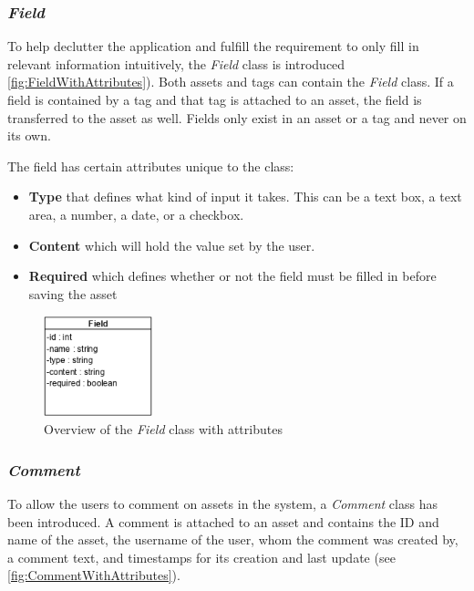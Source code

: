 \subsubsection{\textit{Field}}
To help declutter the application and fulfill the requirement to only fill in relevant information intuitively, the \textit{Field} class is introduced \autoref{fig:FieldWithAttributes}). Both assets and tags can contain the \textit{Field} class. If a field is contained by a tag and that tag is attached to an asset, the field is transferred to the asset as well. Fields only exist in an asset or a tag and never on its own.
\par
The field has certain attributes unique to the class:
\begin{itemize}
    \item \textbf{Type} that defines what kind of input it takes. This can be a text box, a text area, a number, a date, or a checkbox.
    \item \textbf{Content} which will hold the value set by the user.
    \item \textbf{Required} which defines whether or not the field must be filled in before saving the asset
\end{itemize}

\begin{figure}[H]
    \centering
    \includegraphics[width=0.28\textwidth]{figures/Classes/FieldAttributes.png}
    \caption{Overview of the \textit{Field} class with attributes}
    \label{fig:FieldWithAttributes}
\end{figure}


\subsubsection{\textit{Comment}}
To allow the users to comment on assets in the system, a \textit{Comment} class has been introduced. A comment is attached to an asset and contains the ID and name of the asset, the username of the user, whom the comment was created by, a comment text, and timestamps for its creation and last update (see \autoref{fig:CommentWithAttributes}).

